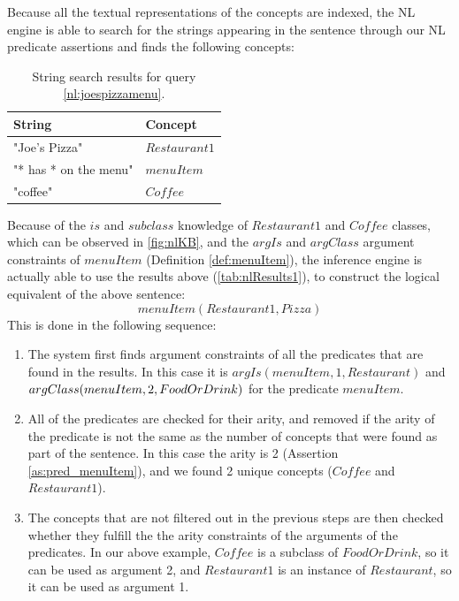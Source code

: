 Because all the textual representations of the concepts are indexed, the NL
engine is able to search for the strings appearing in the sentence through
our NL predicate assertions and finds the following concepts:
\begin{table}[H]
\centering
\caption{String search results for query \ref{nl:joespizzamenu}.}
\label{tab:nlResults1}
\begin{tabular}{|l|l|}
	\hline
	\textbf{String} & \textbf{Concept} \\
    \hline
    "Joe's Pizza" & $Restaurant1$ \\
    \hline
    "* has * on the menu" & $menuItem$ \\
    \hline
    "coffee" & $Coffee$ \\
    \hline
\end{tabular}
\end{table}

Because of the $is$ and $subclass$ knowledge of $Restaurant1$ and $Coffee$ 
classes, which can be observed in \autoref{fig:nlKB}, and the $argIs$ and 
$argClass$ argument constraints of $menuItem$ (Definition \ref{def:menuItem}), 
the inference engine is actually able to use the results above 
(\autoref{tab:nlResults1}), to construct the logical equivalent of the above 
sentence: 
\begin{equation*}
menuItem(Restaurant1, Pizza)
\end{equation*}
This is done in the following sequence:
\begin{enumerate}
\item The system first finds argument constraints of all the predicates that are
found in the results. In this case it is $argIs(menuItem,1,Restaurant)$ and
$argClass(menuItem,\\
2,FoodOrDrink)$ for the predicate $menuItem$.
\item All of the predicates are checked for their arity, and removed if the
arity of the predicate is not the same as the number of concepts that were found
as part of the sentence. In this case the arity is 2 (Assertion 
\ref{as:pred_menuItem}), and we found 2 unique concepts ($Coffee$ and 
$Restaurant1$).
\item The concepts that are not filtered out in the previous steps are then 
checked whether they fulfill the the arity constraints of the arguments of the
predicates. In our above example, $Coffee$ is a subclass of $FoodOrDrink$, so
it can be used as argument 2, and $Restaurant1$ is an instance of $Restaurant$,
so it can be used as argument 1.
\end{enumerate}

